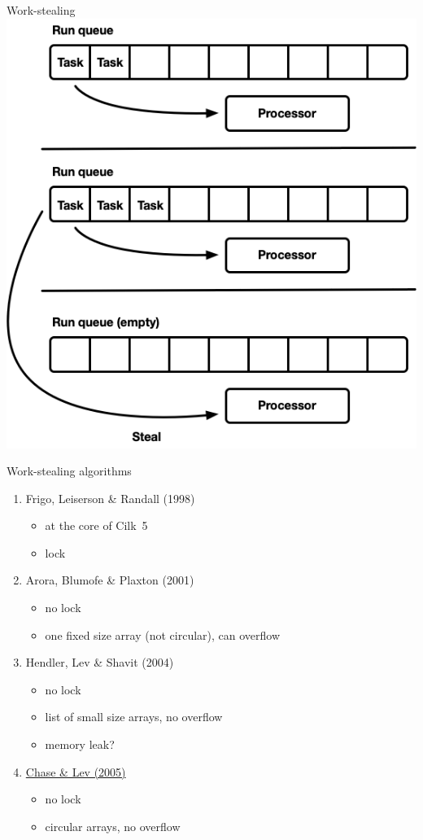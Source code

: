 \begin{frame}{Work-stealing}
\centering
\includegraphics[scale=0.37]{images/work_stealing.png}
\end{frame}


\begin{frame}{Work-stealing algorithms}
\begin{enumerate}
	\item Frigo, Leiserson \& Randall (1998)
		\begin{itemize}
			\item at the core of Cilk~5
			\item lock
		\end{itemize}
	\item Arora, Blumofe \& Plaxton (2001)
		\begin{itemize}
			\item no lock
			\item one fixed size array (not circular), can overflow
		\end{itemize}
	\item Hendler, Lev \& Shavit (2004)
		\begin{itemize}
			\item no lock
			\item list of small size arrays, no overflow
			\item memory leak?
		\end{itemize}
	\item \underline{Chase \& Lev (2005)}
		\begin{itemize}
			\item no lock
			\item circular arrays, no overflow
		\end{itemize}
\end{enumerate}
\end{frame}